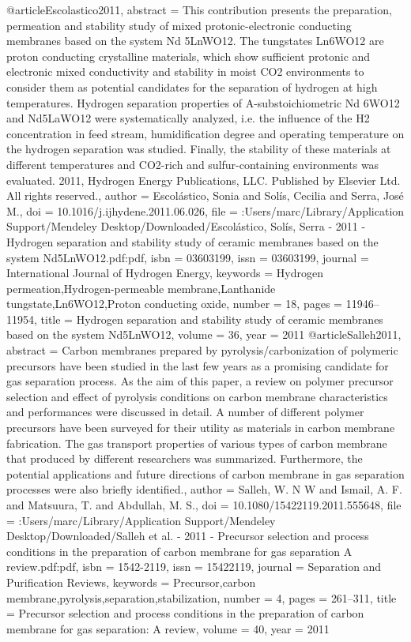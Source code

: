 @article{Escolastico2011,
abstract = {This contribution presents the preparation, permeation and stability study of mixed protonic-electronic conducting membranes based on the system Nd 5LnWO12. The tungstates Ln6WO12 are proton conducting crystalline materials, which show sufficient protonic and electronic mixed conductivity and stability in moist CO2 environments to consider them as potential candidates for the separation of hydrogen at high temperatures. Hydrogen separation properties of A-substoichiometric Nd 6WO12 and Nd5LaWO12 were systematically analyzed, i.e. the influence of the H2 concentration in feed stream, humidification degree and operating temperature on the hydrogen separation was studied. Finally, the stability of these materials at different temperatures and CO2-rich and sulfur-containing environments was evaluated. {\textcopyright} 2011, Hydrogen Energy Publications, LLC. Published by Elsevier Ltd. All rights reserved.},
author = {Escol{\'{a}}stico, Sonia and Sol{\'{i}}s, Cecilia and Serra, Jos{\'{e}} M.},
doi = {10.1016/j.ijhydene.2011.06.026},
file = {:Users/marc/Library/Application Support/Mendeley Desktop/Downloaded/Escol{\'{a}}stico, Sol{\'{i}}s, Serra - 2011 - Hydrogen separation and stability study of ceramic membranes based on the system Nd5LnWO12.pdf:pdf},
isbn = {03603199},
issn = {03603199},
journal = {International Journal of Hydrogen Energy},
keywords = {Hydrogen permeation,Hydrogen-permeable membrane,Lanthanide tungstate,Ln6WO12,Proton conducting oxide},
number = {18},
pages = {11946--11954},
title = {{Hydrogen separation and stability study of ceramic membranes based on the system Nd5LnWO12}},
volume = {36},
year = {2011}
}
@article{Salleh2011,
abstract = {Carbon membranes prepared by pyrolysis/carbonization of polymeric precursors have been studied in the last few years as a promising candidate for gas separation process. As the aim of this paper, a review on polymer precursor selection and effect of pyrolysis conditions on carbon membrane characteristics and performances were discussed in detail. A number of different polymer precursors have been surveyed for their utility as materials in carbon membrane fabrication. The gas transport properties of various types of carbon membrane that produced by different researchers was summarized. Furthermore, the potential applications and future directions of carbon membrane in gas separation processes were also briefly identified.},
author = {Salleh, W. N W and Ismail, A. F. and Matsuura, T. and Abdullah, M. S.},
doi = {10.1080/15422119.2011.555648},
file = {:Users/marc/Library/Application Support/Mendeley Desktop/Downloaded/Salleh et al. - 2011 - Precursor selection and process conditions in the preparation of carbon membrane for gas separation A review.pdf:pdf},
isbn = {1542-2119},
issn = {15422119},
journal = {Separation and Purification Reviews},
keywords = {Precursor,carbon membrane,pyrolysis,separation,stabilization},
number = {4},
pages = {261--311},
title = {{Precursor selection and process conditions in the preparation of carbon membrane for gas separation: A review}},
volume = {40},
year = {2011}
}

